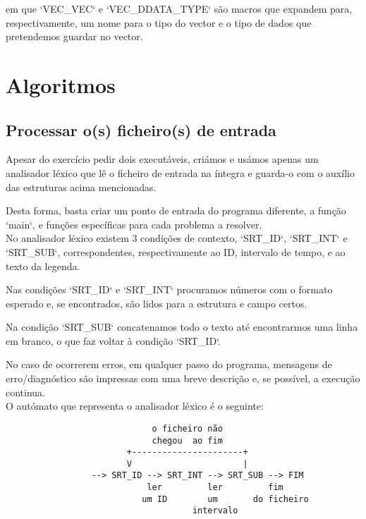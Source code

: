 \documentclass{report}
\begin{document}
em que `VEC\_VEC` e `VEC\_DDATA\_TYPE` são macros que expandem para, respectivamente, um nome para o tipo do vector e o tipo de dados que pretendemos guardar no vector.

\section{Algoritmos}

\subsection{Processar o(s) ficheiro(s) de entrada}

Apesar do exercício pedir dois executáveis, criámos e usámos apenas um analisador léxico que lê o ficheiro de entrada na íntegra e guarda-o com o auxílio das estruturas acima mencionadas.

Desta forma, basta criar um ponto de entrada do programa diferente, a função `main`, e funções específicas para cada problema a resolver.\\

No analisador léxico existem 3 condições de contexto, `SRT\_ID`, `SRT\_INT` e `SRT\_SUB`, correspondentes, respectivamente ao ID, intervalo de tempo, e ao texto da legenda.

Nas condições `SRT\_ID` e `SRT\_INT` procuramos números com o formato esperado e, se encontrados, são lidos para a estrutura e campo certos.

Na condição `SRT\_SUB` concatenamos todo o texto até encontrarmos uma linha em branco, o que faz voltar à condição `SRT\_ID`.

No caso de ocorrerem erros, em qualquer passo do programa, mensagens de erro/diagnóstico são impressas com uma breve descrição e, se possível, a execução continua.\\

O autómato que representa o analisador léxico é o seguinte:

\begin{verbatim}
                             o ficheiro não
                             chegou  ao fim
                        +----------------------+
                        V                      |
                 --> SRT_ID --> SRT_INT --> SRT_SUB --> FIM
                            ler         ler         fim
                           um ID        um       do ficheiro
                                     intervalo
\end{verbatim}
\end{document}
